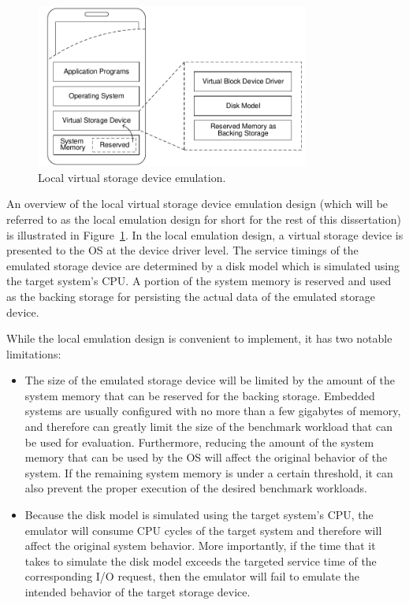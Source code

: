 \begin{figure}[htpb!]
	\centering
	\includegraphics[width=0.8\textwidth]{figures/local-virtual-emulation.pdf}
	\caption{\label{fig:local-virtual-emulation}Local virtual storage device emulation.}
\end{figure}

An overview of the local virtual storage device emulation design (which will be referred to as the local emulation design for short for the rest of this dissertation) is illustrated in Figure~\ref{fig:local-virtual-emulation}. In the local emulation design, a virtual storage device is presented to the OS at the device driver level. The service timings of the emulated storage device are determined by a disk model which is simulated using the target system's CPU. A portion of the system memory is reserved and used as the backing storage for persisting the actual data of the emulated storage device.

While the local emulation design is convenient to implement, it has two notable limitations:

\begin{itemize}
	\item The size of the emulated storage device will be limited by the amount of the system memory that can be reserved for the backing storage. Embedded systems are usually configured with no more than a few gigabytes of memory, and therefore can greatly limit the size of the benchmark workload that can be used for evaluation. Furthermore, reducing the amount of the system memory that can be used by the OS will affect the original behavior of the system. If the remaining system memory is under a certain threshold, it can also prevent the proper execution of the desired benchmark workloads.
	
	\item Because the disk model is simulated using the target system's CPU, the emulator will consume CPU cycles of the target system and therefore will affect the original system behavior. More importantly, if the time that it takes to simulate the disk model exceeds the targeted service time of the corresponding I/O request, then the emulator will fail to emulate the intended behavior of the target storage device.
\end{itemize}

